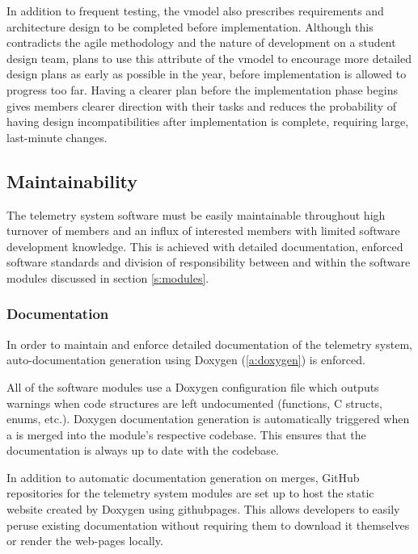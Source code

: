 In addition to frequent testing, the \gls{vmodel} also prescribes requirements and architecture design to be completed
before implementation. Although this contradicts the \gls{agile} methodology and the nature of development on a student
design team,  plans to use this attribute of the \gls{vmodel} to encourage more detailed design
plans as early as possible in the year, before implementation is allowed to progress too far. Having a clearer plan
before the implementation phase begins gives members clearer direction with their tasks and reduces the probability of
having design incompatibilities after implementation is complete, requiring large, last-minute changes.

\subsection{Maintainability}

The  telemetry system software must be easily maintainable throughout high turnover of members
and an influx of interested members with limited software development knowledge. This is achieved with detailed
documentation, enforced software standards and division of responsibility between and within the software modules
discussed in section \ref{s:modules}.

\subsubsection{Documentation}

In order to maintain and enforce detailed documentation of the telemetry system, auto-documentation generation using
Doxygen (\ref{a:doxygen}) is enforced.

All of the software modules use a Doxygen configuration file which outputs warnings when code structures are left
undocumented (functions, C structs, enums, etc.). Doxygen documentation generation is automatically triggered when a
 is merged into the module's respective codebase. This ensures that the documentation is always up to
date with the codebase.

In addition to automatic documentation generation on merges, GitHub repositories for the telemetry system modules are
set up to host the static  website created by Doxygen using \gls{githubpages}. This allows developers
to easily peruse existing documentation without requiring them to download it themselves or render the web-pages
locally.

